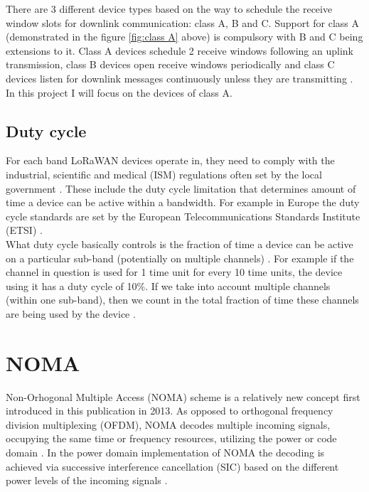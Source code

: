 There are 3 different device types based on the way to schedule the receive window slots for downlink communication: class A, B and C. Support for class A (demonstrated in the figure \ref{fig:class A} above) is compulsory with B and C being extensions to it. Class A devices schedule 2 receive windows following an uplink transmission, class B devices open receive windows periodically and class C devices listen for downlink messages continuously unless they are transmitting \cite{lora_alliance_spec}. In this project I will
focus on the devices of class A.

\subsection{Duty cycle}
For each band LoRaWAN devices operate in, they need to comply with the industrial, scientific and medical (ISM) regulations often set by the local government \cite{duty_cycle}. These include the duty cycle limitation that determines amount of time a device can be active within a bandwidth. For example in Europe the duty cycle standards are set by the 
European Telecommunications Standards Institute (ETSI) \cite{about_etsi}.\\

What duty cycle basically controls is the fraction of time a device can be active on a particular sub-band (potentially on multiple channels) \cite{duty_cycle}. For example if the channel in 
question is used for 1 time unit for every 10 time units,
the device using it has a duty cycle of 10\%. If we take into account multiple channels (within one sub-band), then we count in the total fraction of time these channels are being used by the device \cite{duty_cycle}.

\section{NOMA}
 
 Non-Orhogonal Multiple Access (NOMA) scheme is a relatively new concept first introduced in this publication \cite{noma_original} in 2013. As opposed to orthogonal
frequency division multiplexing (OFDM), NOMA decodes multiple incoming signals, occupying the same time 
or frequency resources, utilizing the power or code domain \cite{noma_imperial}. 
In the power domain implementation of NOMA the decoding is achieved via successive interference cancellation (SIC) based on the different power levels of the incoming signals \cite{noma_imperial} \cite{noma_original}. \\

